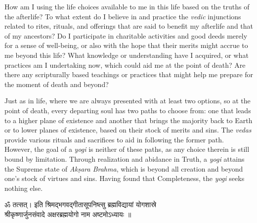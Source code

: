 \newpage
\begin{mananam}{}
\normalfont\mananamtext How am I using the life choices available to me in this life based on the truths of the afterlife? To what extent do I believe in and practice the \emph{vedic} injunctions related to rites, rituals, and offerings that are said to benefit my afterlife and that of my ancestors?
Do I participate in charitable activities and good deeds merely for a sense of well-being, or also with the hope that their merits might accrue to me beyond this life? 
What knowledge or understanding have I acquired, or what practices am I undertaking now, which could aid me at the point of death? Are there any scripturally based teachings or practices that might help me prepare for the moment of death and beyond? 
\end{mananam}
\sreflect
\begin{inspiration}{}
\normalfont\mananamtext Just as in life, where we are always presented with at least two options, so at the point of death, every departing soul has two paths to choose from: one that leads to a higher plane of existence and another that brings the majority back to Earth or to lower planes of existence, based on their stock of merits and sins. The \emph{vedas} provide various rituals and sacrifices to aid in following the former path. However, the goal of a \emph{yogi} is neither of these paths, as any choice therein is still bound by limitation. Through realization and abidance in Truth, a \emph{yogi} attains the Supreme state of \emph{Akṣara Brahma}, which is beyond all creation and beyond one’s stock of virtues and sins. Having found that Completeness, the \emph{yogi} seeks nothing else. 
\end{inspiration}
\newpage

\begin{center}
\devfont ॐ तत्सत्।  इति श्रिमद्भगवद्गीतासूपनिष्त्सु ब्रह्मविद्यायां योगशास्रे\\
श्रीकृष्णार्जुनसंवादे अक्षरब्रह्मयोगो नाम अष्टमोऽध्यायः ॥\\
\end{center}